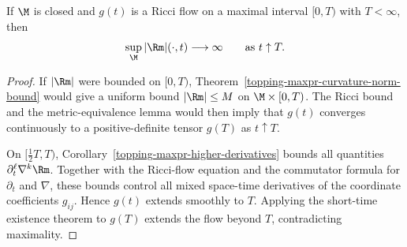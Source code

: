 \begin{theorem}
\label{topping-ricci-flow-curvature-blows-up}
If $\M$ is closed and $g(t)$ is a Ricci flow on a maximal interval
$[0,T)$ with $T<\infty$, then
\[
\sup_{\M}|\Rm|(\cdot,t)\longrightarrow\infty
\qquad\text{as }t\uparrow T.
\]
\end{theorem}

\begin{proof}
\sketch If $|\Rm|$ were bounded on $[0,T)$, Theorem~\ref{topping-maxpr-curvature-norm-bound} would give a
uniform bound $|\Rm|\leq M$ on $\M\times[0,T)$. The Ricci bound and the
metric-equivalence lemma would then imply that $g(t)$ converges continuously
to a positive-definite tensor $g(T)$ as $t\uparrow T$.

On $[\frac12T,T)$, Corollary~\ref{topping-maxpr-higher-derivatives} bounds all quantities
$\partial_t^\ell\nabla^k\Rm$. Together with the Ricci-flow equation and the
commutator formula for $\partial_t$ and $\nabla$, these bounds control all
mixed space-time derivatives of the coordinate coefficients $g_{ij}$. Hence
$g(t)$ extends smoothly to $T$. Applying the short-time existence theorem to
$g(T)$ extends the flow beyond $T$, contradicting maximality.
\end{proof}

